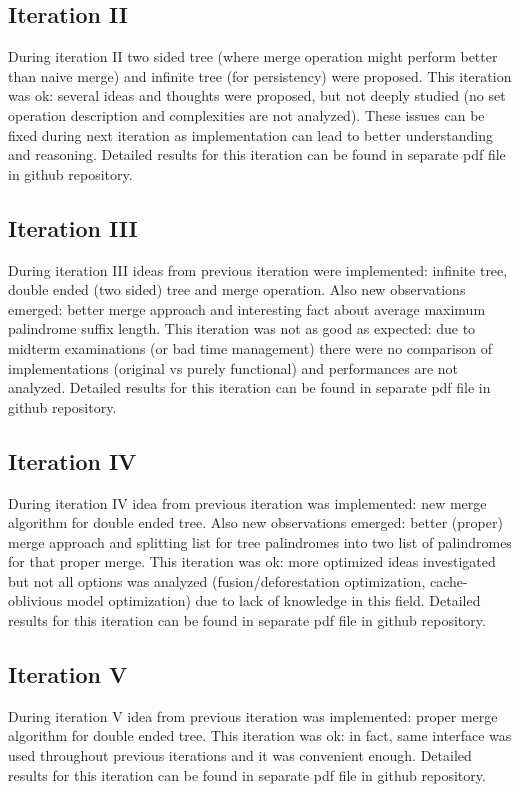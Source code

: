 \subsection{Iteration II}
During iteration II two sided tree (where merge operation might perform better than naive merge) and infinite tree (for persistency) were proposed. This iteration was ok: several ideas and thoughts were proposed, but not deeply studied (no set operation description and complexities are not analyzed). These issues can be fixed during next iteration as implementation can lead to better understanding and reasoning. Detailed results for this iteration can be found in separate pdf file\cite{khazhix2} in github repository.

\subsection{Iteration III}
During iteration III ideas from previous iteration were implemented: infinite tree, double ended (two sided) tree and merge operation. Also new observations emerged: better merge approach and interesting fact about average maximum palindrome suffix length. This iteration was not as good as
expected: due to midterm examinations (or bad time management) there were no comparison of implementations (original vs purely functional) and performances are not analyzed. Detailed results for this iteration can be found in separate pdf file\cite{khazhix3} in github repository.

\subsection{Iteration IV}
During iteration IV idea from previous iteration was implemented: new merge algorithm for double ended tree. Also new observations emerged: better (proper) merge approach and splitting list for tree palindromes into two list of palindromes for that proper merge. This iteration was ok: more optimized ideas investigated but not all options was analyzed (fusion/deforestation optimization, cache-oblivious model optimization) due to lack of knowledge in this field. Detailed results for this iteration can be found in separate pdf file\cite{khazhix4} in github repository.

\subsection{Iteration V}
During iteration V idea from previous iteration was implemented: proper merge algorithm for double ended tree. This iteration was ok: in fact, same interface was used throughout previous iterations and it was convenient enough.
Detailed results for this iteration can be found in separate pdf file\cite{khazhix5} in github repository.

